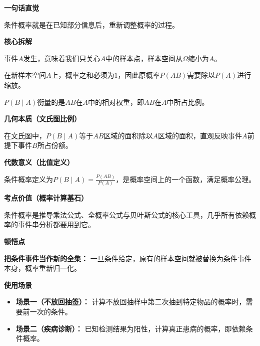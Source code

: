 \begin{explanationbox}
	\textbf{\textcolor{CExplanation}{一句话直觉}}

	条件概率就是在已知部分信息后，重新调整概率的过程。

	\medskip
	\textbf{\textcolor{CExplanation}{核心拆解}}
	\begin{description}[style=nextline, leftmargin=2.8em, labelsep=0.5em, itemsep=0.45em]
		\item[\textbf{\textcolor{CExplanation}{要点一（缩小样本空间）：}}] 事件$A$发生，意味着我们只关心$A$中的样本点，样本空间从$\Omega$缩小为$A$。
		\item[\textbf{\textcolor{CExplanation}{要点二（归一化调整）：}}] 在新样本空间$A$上，概率之和必须为$1$，因此原概率$P(AB)$需要除以$P(A)$进行缩放。
		\item[\textbf{\textcolor{CExplanation}{要点三（比例涵义）：}}] $P(B \mid A)$衡量的是$AB$在$A$中的相对权重，即$AB$在$A$中所占比例。
	\end{description}

	\medskip
	\textbf{\textcolor{CExplanation}{几何本质（文氏图比例）}}

	在文氏图中，$P(B \mid A)$等于$AB$区域的面积除以$A$区域的面积，直观反映事件$A$前提下事件$B$所占份额。

	\medskip
	\textbf{\textcolor{CExplanation}{代数意义（比值定义）}}

	条件概率定义为$P(B \mid A)=\frac{P(AB)}{P(A)}$，是概率空间上的一个函数，满足概率公理。

	\medskip
	\textbf{\textcolor{CExplanation}{考点价值（概率计算基石）}}

	条件概率是推导乘法公式、全概率公式与贝叶斯公式的核心工具，几乎所有依赖概率的事件串分析都要用到它。

	\medskip
	\textbf{\textcolor{CExplanation}{顿悟点}}

	\textbf{把条件事件当作新的全集：} 一旦条件给定，原有的样本空间就被替换为条件事件本身，概率重新归一化。

	\medskip
	\textbf{\textcolor{CExplanation}{使用场景}}
	\begin{itemize}[leftmargin=*, itemsep=0.5em, topsep=0.4em]
		\item \textbf{场景一（不放回抽签）：} 计算不放回抽样中第二次抽到特定物品的概率时，需要前一次的条件。
		\item \textbf{场景二（疾病诊断）：} 已知检测结果为阳性，计算真正患病的概率，即依赖条件概率。
	\end{itemize}
\end{explanationbox}

